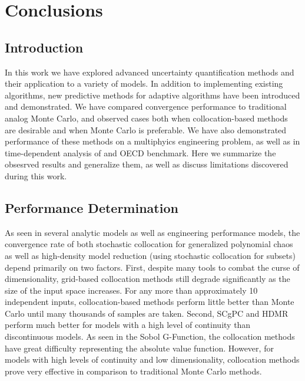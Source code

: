 
\chapter{Conclusions} %

\label{Chapter7} %



\section{Introduction}
In this work we have explored advanced uncertainty quantification methods and their application to a variety of models.
In addition to implementing existing algorithms, new predictive methods for adaptive algorithms have been introduced
and demonstrated.  We have compared convergence performance to traditional analog Monte Carlo, and observed cases both
when collocation-based methods are desirable and when Monte Carlo is preferable.  We have also demonstrated performance
of these methods on a multiphyics engineering problem, as well as in time-dependent analysis of and OECD benchmark.  Here we
summarize the obsesrved results and generalize them, as well as discuss limitations discovered during this work.

\section{Performance Determination}
As seen in several analytic models as well as engineering performance models, the convergence rate of both stochastic collocation
for generalized polynomial chaos as well as high-density model reduction (using stochastic collocation for subsets) depend primarily
on two factors. 
First, despite many tools to combat the curse of dimensionality, grid-based collocation methods still degrade
significantly as the size of the input space increases.  For any more than approximately 10 independent inputs, collocation-based
methods perform little better than Monte Carlo until many thousands of samples are taken.  Second, SCgPC and HDMR perform much
better for models with a high level of continuity than discontinuous models.  As seen in the Sobol G-Function, the collocation
methods have great difficulty representing the absolute value function.  
However, for models with high levels of continuity and low dimensionality, collocation methods prove very effective in comparison
to traditional Monte Carlo methods.

